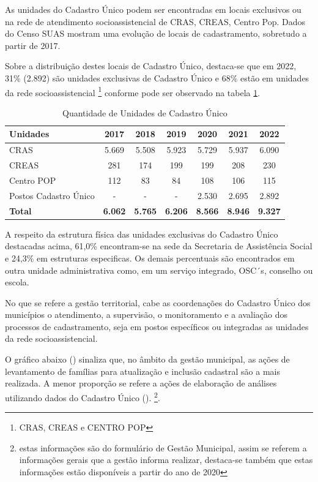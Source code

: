 \documentclass[
  brazilian]{report}
\begin{document}
As unidades do Cadastro Único podem ser encontradas em locais exclusivos
ou na rede de atendimento socioassistencial de CRAS, CREAS, Centro Pop.
Dados do Censo SUAS mostram uma evolução de locais de cadastramento,
sobretudo a partir de 2017.

Sobre a distribuição destes locais de Cadastro Único, destaca-se que em
2022, 31\% (2.892) são unidades exclusivas de Cadastro Único e 68\%
estão em unidades da rede socioassistencial
\footnote{CRAS, CREAS e CENTRO POP} conforme pode ser observado na
tabela \ref{tab:qtd_unidades}.

\begin{table}[H]
\centering
\caption{Quantidade de Unidades de Cadastro Único}
\label{tab:qtd_unidades}
\begin{tabular}{@{}lcccccc@{}}
\toprule
Unidades             & 2017  & 2018 & 2019 & 2020 &  2021 & 2022            \\ \midrule
CRAS                    & 5.669 & 5.508 & 5.923 & 5.729 & 5.937 & 6.090         \\
CREAS                   & 281 & 174 & 199 & 199 & 208 & 230                     \\
Centro POP              & 112 & 83 & 84 & 108 & 106 & 115                       \\
Postos Cadastro Único   & - & - & - & 2.530 & 2.695 & 2.892                       \\ \bottomrule
\textbf{Total}                   &\textbf{6.062} & \textbf{5.765} & \textbf{6.206} & \textbf{8.566} & \textbf{8.946} & \textbf{9.327}          \\ \bottomrule
\end{tabular}
\end{table}

A respeito da estrutura física das unidades exclusivas do Cadastro Único
destacadas acima, 61,0\% encontram-se na sede da Secretaria de
Assistência Social e 24,3\% em estruturas especificas. Os demais
percentuais são encontrados em outra unidade administrativa como, em um
serviço integrado, OSC´s, conselho ou escola.

No que se refere a gestão territorial, cabe as coordenações do Cadastro
Único dos municípios o atendimento, a supervisão, o monitoramento e a
avaliação dos processos de cadastramento, seja em postos específicos ou
integradas as unidades da rede socioassistencial.

O gráfico abaixo () sinaliza que, no âmbito da
gestão municipal, as ações de levantamento de famílias para atualização
e inclusão cadastral são a mais realizada. A menor proporção se refere a
ações de elaboração de análises utilizando dados do Cadastro Único
().
\footnote{estas informações são do formulário de Gestão Municipal, assim se referem a informações gerais que a gestão informa realizar, destaca-se também que estas informações estão disponíveis a partir do ano de 2020}.
\end{document}
